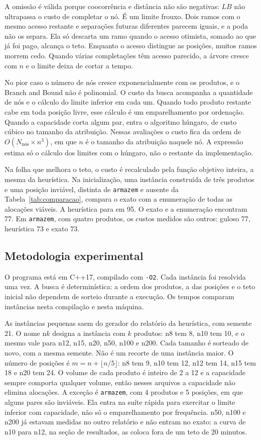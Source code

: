 \documentclass[conference,a4paper]{IEEEtran}
\begin{document}
A omissão é válida porque coocorrência e distância não são negativas: \(LB\) não ultrapassa o custo de completar o nó.
É um limite frouxo.
Dois ramos com o mesmo acesso restante e separações futuras diferentes parecem iguais, e a poda não os separa.
Ela só descarta um ramo quando o acesso otimista, somado ao que já foi pago, alcança o teto.
Enquanto o acesso distingue as posições, muitos ramos morrem cedo.
Quando várias completações têm acesso parecido, a árvore cresce com \(n\) e o limite deixa de cortar a tempo.

No pior caso o número de nós cresce exponencialmente com os produtos, e o Branch and Bound não é polinomial. O custo da busca acompanha a quantidade de nós e o cálculo do limite inferior em cada um. Quando todo produto restante cabe em toda posição livre, esse cálculo é um emparelhamento por ordenação. Quando a capacidade corta algum par, entra o algoritmo húngaro, de custo cúbico no tamanho da atribuição. Nessas avaliações o custo fica da ordem de \(O(N_{\mathrm{nós}} \times n^{3})\), em que \(n\) é o tamanho da atribuição naquele nó. A expressão estima só o cálculo dos limites com o húngaro, não o restante da implementação.

Na folha que melhora o teto, o custo é recalculado pela função objetivo inteira, a mesma da heurística.
Na inicialização, uma instância construída de três produtos e uma posição inviável, distinta de \texttt{armazem} e ausente da Tabela~\ref{tab:comparacao}, compara o exato com a enumeração de todas as alocações viáveis. A heurística para em 95. O exato e a enumeração encontram 77. Em \texttt{armazem}, com quatro produtos, os custos medidos são outros: guloso 77, heurística 73 e exato 73.

\subsection{Metodologia experimental}
O programa está em C++17, compilado com \texttt{-O2}.
Cada instância foi resolvida uma vez.
A busca é determinística: a ordem dos produtos, a das posições e o teto inicial não dependem de sorteio durante a execução.
Os tempos comparam instâncias nesta compilação e nesta máquina.

As instâncias pequenas saem do gerador do relatório da heurística, com semente 21.
O nome n\(k\) designa a instância com \(k\) produtos: n8 tem 8, n10 tem 10, e o mesmo vale para n12, n15, n20, n50, n100 e n200.
Cada tamanho é sorteado de novo, com a mesma semente.
Não é um recorte de uma instância maior.
O número de posições é \(m = n + \lfloor n/5 \rfloor\): n8 tem 9, n10 tem 12, n12 tem 14, n15 tem 18 e n20 tem 24.
O volume de cada produto é inteiro de 2 a 12 e a capacidade sempre comporta qualquer volume, então nesses arquivos a capacidade não elimina alocações.
A exceção é \texttt{armazem}, com 4 produtos e 5 posições, em que alguns pares são inviáveis.
Ela entra na suíte rápida para exercitar o limite inferior com capacidade, não só o emparelhamento por frequência.
n50, n100 e n200 já estavam medidas no outro relatório e não entram no exato: a curva de n10 para n12, na seção de resultados, as coloca fora de um teto de 20 minutos.
\end{document}
